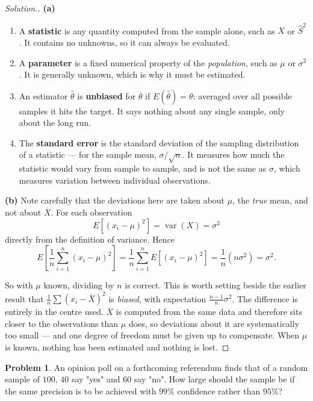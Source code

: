 \documentclass[11pt,a4paper]{article}
\theoremstyle{definition}
\newtheorem{problemx}{Problem}[section]
\newenvironment{problem}{\begin{problemx}}{\end{problemx}}
\newenvironment{solution}
  {\renewcommand{\qedsymbol}{}\begin{proof}[\textit{Solution}.]}
  {\end{proof}}
\begin{document}
\begin{solution}
\textbf{(a)}
\begin{enumerate}
\item[(i).] A \textbf{statistic} is any quantity computed from the sample alone, such as
$\overline{X}$ or $\widehat{S}^2$. It contains no unknowns, so it can always be evaluated.
\item[(ii).] A \textbf{parameter} is a fixed numerical property of the \emph{population},
such as $\mu$ or $\sigma^2$. It is generally unknown, which is why it must be estimated.
\item[(iii).] An estimator $\widehat{\theta}$ is \textbf{unbiased} for $\theta$ if
$E(\widehat{\theta})=\theta$: averaged over all possible samples it hits the target. It says
nothing about any single sample, only about the long run.
\item[(iv).] The \textbf{standard error} is the standard deviation of the sampling
distribution of a statistic --- for the sample mean, $\sigma/\sqrt{n}$. It measures how much
the statistic would vary from sample to sample, and is not the same as $\sigma$, which
measures variation between individual observations.
\end{enumerate}

\textbf{(b)} Note carefully that the deviations here are taken about $\mu$, the \emph{true}
mean, and not about $\overline{X}$. For each observation
\[E\left[(x_i-\mu)^2\right]=\operatorname{var}(X)=\sigma^2\]
directly from the definition of variance. Hence
\[E\left[\frac{1}{n}\sum_{i=1}^{n}(x_i-\mu)^2\right]
=\frac{1}{n}\sum_{i=1}^{n}E\left[(x_i-\mu)^2\right]=\frac{1}{n}\left(n\sigma^2\right)=\sigma^2.\]

So with $\mu$ known, dividing by $n$ is correct. This is worth setting beside the earlier
result that $\frac{1}{n}\sum(x_i-\overline{X})^2$ is \emph{biased}, with expectation
$\frac{n-1}{n}\sigma^2$. The difference is entirely in the centre used. $\overline{X}$ is
computed from the same data and therefore sits closer to the observations than $\mu$ does, so
deviations about it are systematically too small --- and one degree of freedom must be given
up to compensate. When $\mu$ is known, nothing has been estimated and nothing is lost.
\end{solution}

\begin{problem}
An opinion poll on a forthcoming referendum finds that of a random sample of $100$, $40$ say
"yes" and $60$ say "no". How large should the sample be if the same precision is to be
achieved with $99\%$ confidence rather than $95\%$?
\end{problem}
\end{document}
